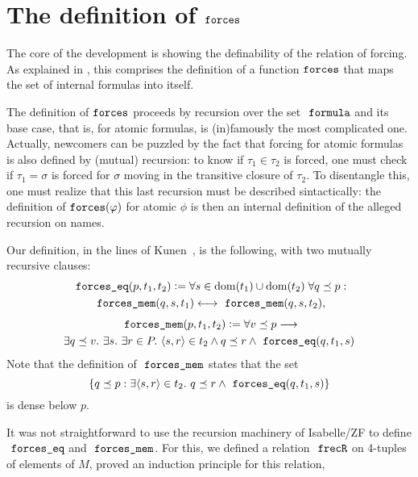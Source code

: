 \section{The definition of $\mathop{\mathtt{forces}}$}

The core of the development is showing the definability of the
relation of forcing. As explained in
\cite[Sect.~8]{2019arXiv190103313G}, this comprises the 
definition of a function $\mathop{\mathtt{forces}}$ that maps the set of internal
formulas into itself. 

The definition of $\mathop{\mathtt{forces}}$ proceeds by recursion
over the set $\formula$ and its base case, that is, for
atomic formulas, is (in)famously the most complicated one. Actually,
newcomers can be puzzled by the fact that forcing for atomic
formulas is also defined by (mutual) recursion: to know if $\tau_1\in\tau_2$ is
forced, one must check if $\tau_1=\sigma$ is forced for $\sigma$
moving in the transitive closure of $\tau_2$. To disentangle this, one
must realize that this last recursion must be described sintactically:
the definition of $\mathop{\mathtt{forces}}(\varphi)$ for atomic $\phi$ is then an
internal definition of the alleged recursion on names. 

Our definition, in the lines of Kunen~\cite[p.~257]{kunen2011set}, is the
following, with two mutually recursive clauses:
\begin{multline}\label{eq:def-forcing-equality}
  \forceseq (p,t_1,t_2) \defi 
  \forall s\in\dom(t_1)\cup\dom(t_2)\;\forall q\pleq p :\\
  \forcesmem(q,s,t_1)\lsii 
  \forcesmem(q,s,t_2),
\end{multline}
\begin{multline}\label{eq:def-forcing-membership}
  \forcesmem(p,t_1,t_2) \defi  \forall v\pleq p \limp\\
      \exists q\pleq v. \ \exists s.\ \exists r\in P .\ \lb s,r\rb \in
      t_2 \land q \pleq r \land \forceseq(q,t_1,s)
\end{multline}
Note that the definition of $\forcesmem$ states that the set 
\[
\{q\pleq p : \exists \lb s,r\rb\in t_2 . \ q\pleq r \land \forceseq(q,t_1,s)\}
\]
is dense below $p$.

It was not straightforward to use the recursion machinery of
Isabelle/ZF to define $\forceseq$ and $\forcesmem$. For this, we
defined a relation $\frecR$ on 4-tuples of elements of $M$, proved an
induction principle for this relation,

